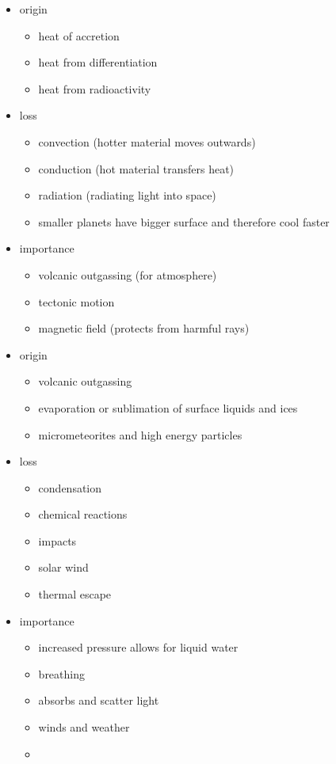 \documentclass{article}
\theoremstyle{sltheorem}
\begin{document}
\begin{itemize}
    \item origin
    \begin{itemize}
        \item heat of accretion
        \item heat from differentiation
        \item heat from radioactivity
    \end{itemize}
    \item loss
    \begin{itemize}
        \item convection (hotter material moves outwards)
        \item conduction (hot material transfers heat)
        \item radiation (radiating light into space)
        \item smaller planets have bigger surface and therefore cool faster
    \end{itemize}
    \item importance
    \begin{itemize}
        \item volcanic outgassing (for atmosphere)
        \item tectonic motion
        \item magnetic field (protects from harmful rays)
    \end{itemize}
\end{itemize}
\begin{itemize}
    \item origin
    \begin{itemize}
        \item volcanic outgassing
        \item evaporation or sublimation of surface liquids and ices
        \item micrometeorites and high energy particles
    \end{itemize}
    \item loss
    \begin{itemize}
        \item condensation
        \item chemical reactions
        \item impacts
        \item solar wind
        \item thermal escape
    \end{itemize}
    \item importance
    \begin{itemize}
        \item increased pressure allows for liquid water
        \item breathing
        \item absorbs and scatter light
        \item winds and weather
        \item {}
    \end{itemize}
\end{itemize}
\end{document}
